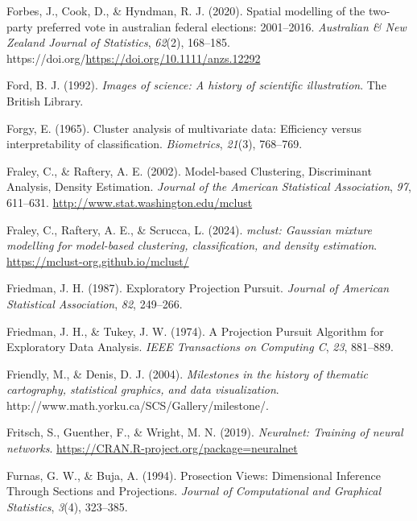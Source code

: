 \documentclass[
  letterpaper,
]{krantz}
\newlength{\cslhangindent}
\newenvironment{CSLReferences}[2] %
 {\begin{list}{}{%
  \setlength{\itemindent}{0pt}
  \setlength{\leftmargin}{0pt}
  \setlength{\parsep}{0pt}
  \ifodd #1
   \setlength{\leftmargin}{\cslhangindent}
   \setlength{\itemindent}{-1\cslhangindent}
  \fi
  \setlength{\itemsep}{#2\baselineskip}}}
 {\end{list}}
\begin{document}
\begin{CSLReferences}{1}{0}
Forbes, J., Cook, D., \& Hyndman, R. J. (2020). Spatial modelling of the
two-party preferred vote in australian federal elections: 2001--2016.
\emph{Australian \& New Zealand Journal of Statistics}, \emph{62}(2),
168--185. https://doi.org/\url{https://doi.org/10.1111/anzs.12292}

Ford, B. J. (1992). \emph{Images of science: A history of scientific
illustration}. The British Library.

Forgy, E. (1965). Cluster analysis of multivariate data: Efficiency
versus interpretability of classification. \emph{Biometrics},
\emph{21}(3), 768--769.

Fraley, C., \& Raftery, A. E. (2002). Model-based {C}lustering,
{D}iscriminant {A}nalysis, {D}ensity {E}stimation. \emph{Journal of the
American Statistical Association}, \emph{97}, 611--631.
\url{http://www.stat.washington.edu/mclust}

Fraley, C., Raftery, A. E., \& Scrucca, L. (2024). \emph{{mclust}:
Gaussian mixture modelling for model-based clustering, classification,
and density estimation}. \url{https://mclust-org.github.io/mclust/}

Friedman, J. H. (1987). {E}xploratory {P}rojection {P}ursuit.
\emph{Journal of American Statistical Association}, \emph{82}, 249--266.

Friedman, J. H., \& Tukey, J. W. (1974). {A} {P}rojection {P}ursuit
{A}lgorithm for {E}xploratory {D}ata {A}nalysis. \emph{IEEE Transactions
on Computing C}, \emph{23}, 881--889.

Friendly, M., \& Denis, D. J. (2004). \emph{Milestones in the history of
thematic cartography, statistical graphics, and data visualization}.
http://www.math.yorku.ca/SCS/Gallery/milestone/.

Fritsch, S., Guenther, F., \& Wright, M. N. (2019). \emph{Neuralnet:
Training of neural networks}.
\url{https://CRAN.R-project.org/package=neuralnet}

Furnas, G. W., \& Buja, A. (1994). Prosection {V}iews: {D}imensional
{I}nference {T}hrough {S}ections and {P}rojections. \emph{Journal of
Computational and Graphical Statistics}, \emph{3}(4), 323--385.


\end{CSLReferences}
\end{document}
